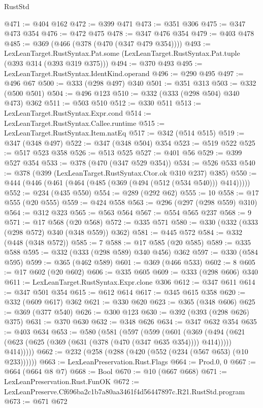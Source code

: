 \begin{lexlean}{RustStd}
\begin{coremodule}
@471 := @404 @162
@472 := @399 @471
@473 := @351 @306
@475 := @347 @473 @354
@476 := @472 @475
@478 := @347 @476 @354
@479 := @403 @478
@485 := @369 (@466 (@378 (@470 (@347 @479 @354))))
@493 := LexLeanTarget.RustSyntax.Pat.some
    (LexLeanTarget.RustSyntax.Pat.tuple (@393 @314 (@393 @319 @375)))
@494 := @370 @493
@495 := LexLeanTarget.RustSyntax.IdentKind.operand
@496 := @290 @495
@497 := @496 @67
@500 := @333 (@298 @497) @340
@501 := @351 @313
@503 := @332 (@500 @501)
@504 := @496 @123
@510 := @332 (@333 (@298 @504) @340 @473) @362
@511 := @503 @510
@512 := @330 @511
@513 := LexLeanTarget.RustSyntax.Expr.cond
@514 := LexLeanTarget.RustSyntax.Callee.runtime
@515 := LexLeanTarget.RustSyntax.Item.natEq
@517 := @342 (@514 @515)
@519 := @347 (@348 @497)
@522 := @347 (@348 @504) @354
@523 := @519 @522
@525 := @517 @523 @358
@526 := @513 @525
@527 := @401 @56
@529 := @399 @527 @354
@533 := @378 (@470 (@347 @529 @354))
@534 := @526 @533
@540 := @378 (@399 (LexLeanTarget.RustSyntax.Ctor.ok @310 @237) @385)
@550 := @444 (@446 (@461 (@464 (@485 (@369 (@494 (@512 (@534 @540))) @414)))))
@552 := @234 (@435 @550)
@554 := @289 (@292 @62)
@555 := 10
@558 := @17 @555 (@20 @555)
@559 := @424 @558
@563 := @296 (@297 (@298 @559) @310)
@564 := @312 @323
@565 := @563 @564
@567 := @554 @565 @237
@568 := 9
@571 := @17 @568 (@20 @568)
@572 := @335 @571
@580 := @330 (@332 (@333 (@298 @572) @340 (@348 @559)) @362)
@581 := @445 @572
@584 := @332 (@448 (@348 @572))
@585 := 7
@588 := @17 @585 (@20 @585)
@589 := @335 @588
@595 := @332 (@333 (@298 @589) @340 @456) @362
@597 := @330 (@584 @595)
@599 := @365 (@462 @589)
@601 := @369 (@466 @533)
@602 := 8
@605 := @17 @602 (@20 @602)
@606 := @335 @605
@609 := @333 (@298 @606) @340
@611 := LexLeanTarget.RustSyntax.Expr.clone @306
@612 := @347 @611
@614 := @347 @501 @354
@615 := @612 @614
@617 := @345 @615 @358
@620 := @332 (@609 @617) @362
@621 := @330 @620
@623 := @365 (@348 @606)
@625 := @369 (@377 @540)
@626 := @300 @123
@630 := @392 (@393 (@298 @626) @375)
@631 := @370 @630
@632 := @348 @626
@634 := @347 @632 @354
@635 := @403 @634
@653 := @580
    (@581
      (@597
        (@599
          (@601
            (@369
              (@494 (@621 (@623 (@625 (@369 (@631 (@378 (@470 (@347 @635 @354)))) @414)))))
              @414)))))
@662 := @232 (@258 (@288 (@420 (@552 (@234 (@567 @653) (@10 @233))))))
@663 := LexLeanPreservation.Rust.Flags
@664 := Prod.{0, 0}
@667 := @664 (@664 @8 @7)
@668 := Bool
@670 := @10 (@667 @668)
@671 := LexLeanPreservation.Rust.FunOK
@672 := LexLeanPreserve.Cf696ba2c1b7a80aa3461f4d56447897c.R21.RustStd.program
@673 := @671 @672

\end{coremodule}
\end{lexlean}
